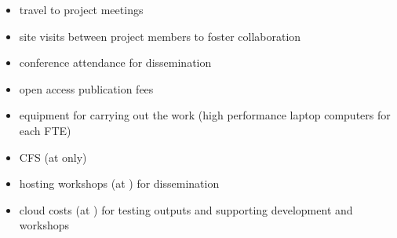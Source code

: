 \begin{itemize}[noitemsep]
\item travel to project meetings
\item site visits between project members to foster collaboration
\item conference attendance for dissemination
\item open access publication fees
\item equipment for carrying out the work (high performance laptop computers for each FTE)
\item CFS (at  only)
\item hosting workshops (at ) for dissemination
\item cloud costs (at ) for testing outputs and supporting development and workshops 
\end{itemize}


%
%
